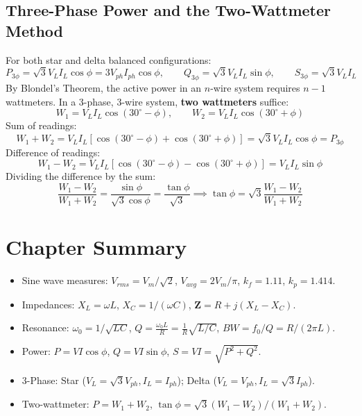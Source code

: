 \subsection{Three-Phase Power and the Two-Wattmeter Method}
For both star and delta balanced configurations:
\begin{equation}
P_{3\phi} = \sqrt{3} V_L I_L \cos\phi = 3 V_{ph} I_{ph} \cos\phi, \qquad Q_{3\phi} = \sqrt{3} V_L I_L \sin\phi, \qquad S_{3\phi} = \sqrt{3} V_L I_L
\end{equation}
By Blondel's Theorem, the active power in an $n$-wire system requires $n-1$ wattmeters. In a 3-phase, 3-wire system, \textbf{two wattmeters} suffice:
\begin{equation}
W_1 = V_L I_L \cos(30^\circ - \phi), \qquad W_2 = V_L I_L \cos(30^\circ + \phi)
\end{equation}
Sum of readings:
\begin{equation}
W_1 + W_2 = V_L I_L [\cos(30^\circ - \phi) + \cos(30^\circ + \phi)] = \sqrt{3} V_L I_L \cos\phi = P_{3\phi}
\end{equation}
Difference of readings:
\begin{equation}
W_1 - W_2 = V_L I_L [\cos(30^\circ - \phi) - \cos(30^\circ + \phi)] = V_L I_L \sin\phi
\end{equation}
Dividing the difference by the sum:
\begin{equation}
\frac{W_1 - W_2}{W_1 + W_2} = \frac{\sin\phi}{\sqrt{3}\cos\phi} = \frac{\tan\phi}{\sqrt{3}} \implies \tan\phi = \sqrt{3}\frac{W_1 - W_2}{W_1 + W_2}
\end{equation}

\section{Chapter Summary}
\begin{itemize}[leftmargin=1.5em]
    \item Sine wave measures: $V_{rms} = V_m / \sqrt{2}$, $V_{avg} = 2V_m / \pi$, $k_f = 1.11$, $k_p = 1.414$.
    \item Impedances: $X_L = \omega L$, $X_C = 1/(\omega C)$, $\mathbf{Z} = R + j(X_L - X_C)$.
    \item Resonance: $\omega_0 = 1/\sqrt{LC}$, $Q = \frac{\omega_0 L}{R} = \frac{1}{R}\sqrt{L/C}$, $BW = f_0 / Q = R / (2\pi L)$.
    \item Power: $P = V I \cos\phi$, $Q = V I \sin\phi$, $S = V I = \sqrt{P^2 + Q^2}$.
    \item 3-Phase: Star ($V_L = \sqrt{3}V_{ph}, I_L = I_{ph}$); Delta ($V_L = V_{ph}, I_L = \sqrt{3}I_{ph}$).
    \item Two-wattmeter: $P = W_1 + W_2$, $\tan\phi = \sqrt{3}(W_1 - W_2)/(W_1 + W_2)$.
\end{itemize}
